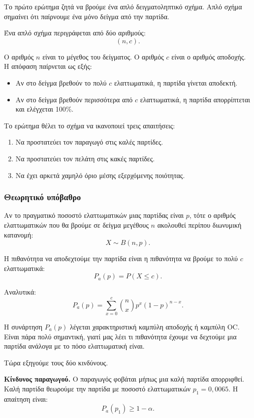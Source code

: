 \documentclass[12pt,a4paper]{article}
\newcommand{\Pa}{P_{\!a}}
\newcommand{\OC}{\textenglish{OC}}
\begin{document}
Το πρώτο ερώτημα ζητά να βρούμε ένα απλό δειγματοληπτικό σχήμα. Απλό σχήμα
σημαίνει ότι παίρνουμε ένα μόνο δείγμα από την παρτίδα.

Ένα απλό σχήμα περιγράφεται από δύο αριθμούς:
\[
    (n,c).
\]

Ο αριθμός \(n\) είναι το μέγεθος του δείγματος. Ο αριθμός \(c\) είναι ο
αριθμός αποδοχής. Η απόφαση παίρνεται ως εξής:

\begin{itemize}
    \item Αν στο δείγμα βρεθούν το πολύ \(c\) ελαττωματικά, η παρτίδα γίνεται
    αποδεκτή.
    \item Αν στο δείγμα βρεθούν περισσότερα από \(c\) ελαττωματικά, η παρτίδα
    απορρίπτεται και ελέγχεται 100\%.
\end{itemize}

Το ερώτημα θέλει το σχήμα να ικανοποιεί τρεις απαιτήσεις:

\begin{enumerate}
    \item Να προστατεύει τον παραγωγό στις καλές παρτίδες.
    \item Να προστατεύει τον πελάτη στις κακές παρτίδες.
    \item Να έχει αρκετά χαμηλό όριο μέσης εξερχόμενης ποιότητας.
\end{enumerate}

\subsubsection*{Θεωρητικό υπόβαθρο}

Αν το πραγματικό ποσοστό ελαττωματικών μιας παρτίδας είναι \(p\), τότε ο
αριθμός ελαττωματικών που θα βρούμε σε δείγμα μεγέθους \(n\) ακολουθεί περίπου
διωνυμική κατανομή:
\[
    X\sim B(n,p).
\]

Η πιθανότητα να αποδεχτούμε την παρτίδα είναι η πιθανότητα να βρούμε το πολύ
\(c\) ελαττωματικά:
\[
    \Pa(p)=P(X\le c).
\]

Αναλυτικά:
\[
    \Pa(p)=
    \sum_{x=0}^{c}
    \binom{n}{x}p^x(1-p)^{n-x}.
\]

Η συνάρτηση \(\Pa(p)\) λέγεται χαρακτηριστική καμπύλη αποδοχής ή καμπύλη
\OC. Είναι πάρα πολύ σημαντική, γιατί μας λέει τι πιθανότητα έχουμε να
δεχτούμε μια παρτίδα ανάλογα με το πόσο ελαττωματική είναι.

Τώρα εξηγούμε τους δύο κινδύνους.

\textbf{Κίνδυνος παραγωγού.} Ο παραγωγός φοβάται μήπως μια καλή παρτίδα
απορριφθεί. Καλή παρτίδα θεωρούμε την παρτίδα με ποσοστό ελαττωματικών
\(p_1=0{,}0065\). Η απαίτηση είναι:
\[
    \Pa(p_1)\ge 1-\alpha.
\]
\end{document}
